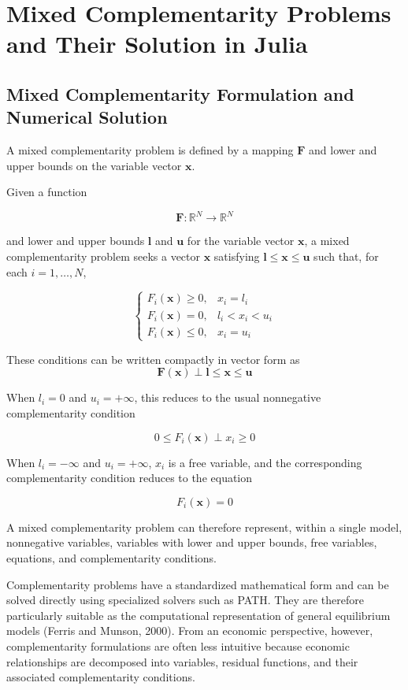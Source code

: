 \documentclass[
  letterpaper,
  DIV=11,
  numbers=noendperiod]{scrreprt}
\begin{document}
\section{Mixed Complementarity Problems and Their Solution in
Julia}\label{mixed-complementarity-problems-and-their-solution-in-julia}

\subsection{Mixed Complementarity Formulation and Numerical
Solution}\label{mixed-complementarity-formulation-and-numerical-solution}

A mixed complementarity problem is defined by a mapping \(\mathbf F\)
and lower and upper bounds on the variable vector \(\mathbf x\).

Given a function

\[
\mathbf F:\mathbb R^N\rightarrow\mathbb R^N
\]

and lower and upper bounds \(\mathbf l\) and \(\mathbf u\) for the
variable vector \(\mathbf x\), a mixed complementarity problem seeks a
vector \(\mathbf x\) satisfying \(\mathbf l\leq\mathbf x\leq\mathbf u\)
such that, for each \(i=1,\ldots,N\),

\[
\begin{cases}
F_i(\mathbf x)\geq0, & x_i=l_i\\
F_i(\mathbf x)=0, & l_i<x_i<u_i\\
F_i(\mathbf x)\leq0, & x_i=u_i
\end{cases}
\]

These conditions can be written compactly in vector form as \[
\mathbf F(\mathbf x)\perp\mathbf l\leq\mathbf x\leq\mathbf u
\]

When \(l_i=0\) and \(u_i=+\infty\), this reduces to the usual
nonnegative complementarity condition

\[
0\leq F_i(\mathbf x)\perp x_i\geq0
\]

When \(l_i=-\infty\) and \(u_i=+\infty\), \(x_i\) is a free variable,
and the corresponding complementarity condition reduces to the equation

\[
F_i(\mathbf x)=0
\]

A mixed complementarity problem can therefore represent, within a single
model, nonnegative variables, variables with lower and upper bounds,
free variables, equations, and complementarity conditions.

Complementarity problems have a standardized mathematical form and can
be solved directly using specialized solvers such as PATH. They are
therefore particularly suitable as the computational representation of
general equilibrium models (Ferris and Munson, 2000). From an economic
perspective, however, complementarity formulations are often less
intuitive because economic relationships are decomposed into variables,
residual functions, and their associated complementarity conditions.
\end{document}
